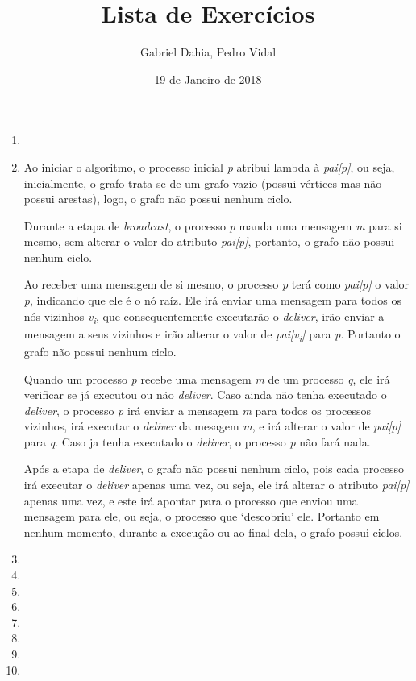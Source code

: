 \documentclass{article}
\title{Lista de Exercícios}
\author{Gabriel Dahia, Pedro Vidal}
\date{19 de Janeiro de 2018}
\begin{document}
 
\maketitle
 
\begin{enumerate}

\item

\item Ao iniciar o algoritmo, o processo inicial \textit{p} atribui lambda à \textit{pai[p]}, ou seja, inicialmente, o grafo trata-se de um grafo vazio (possui vértices mas não possui arestas), logo, o grafo não possui nenhum ciclo.

Durante a etapa de \textit{broadcast}, o processo \textit{p} manda uma mensagem \textit{m} para si mesmo, sem alterar o valor do atributo \textit{pai[p]}, portanto, o grafo não possui nenhum ciclo.

Ao receber uma mensagem de si mesmo, o processo \textit{p} terá como \textit{pai[p]} o valor \textit{p}, indicando que ele é o nó raíz. Ele irá enviar uma mensagem para todos os nós vizinhos \textit{v\textsubscript{i}}, que consequentemente executarão o \textit{deliver}, irão enviar a mensagem a seus vizinhos e irão alterar o valor de \textit{pai[\textit{v\textsubscript{i}}]} para \textit{p}. Portanto o grafo não possui nenhum ciclo.

Quando um processo \textit{p} recebe uma mensagem \textit{m} de um processo \textit{q}, ele irá verificar se já executou ou não \textit{deliver}. Caso ainda não tenha executado o \textit{deliver}, o processo \textit{p} irá enviar a mensagem \textit{m} para todos os processos vizinhos, irá executar o \textit{deliver} da mesagem \textit{m}, e irá alterar o valor de \textit{pai[p]} para \textit{q}. Caso ja tenha executado o \textit{deliver}, o processo \textit{p} não fará nada.

Após a etapa de \textit{deliver}, o grafo não possui nenhum ciclo, pois cada processo irá executar o \textit{deliver} apenas uma vez, ou seja, ele irá alterar o atributo \textit{pai[p]} apenas uma vez, e este irá apontar para o processo que enviou uma mensagem para ele, ou seja, o processo que `descobriu' ele. Portanto em nenhum momento, durante a execução ou ao final dela, o grafo possui ciclos. 

\item

\item

\item

\item

\item

\item

\item

\item

\end{enumerate}
 
\end{document}
